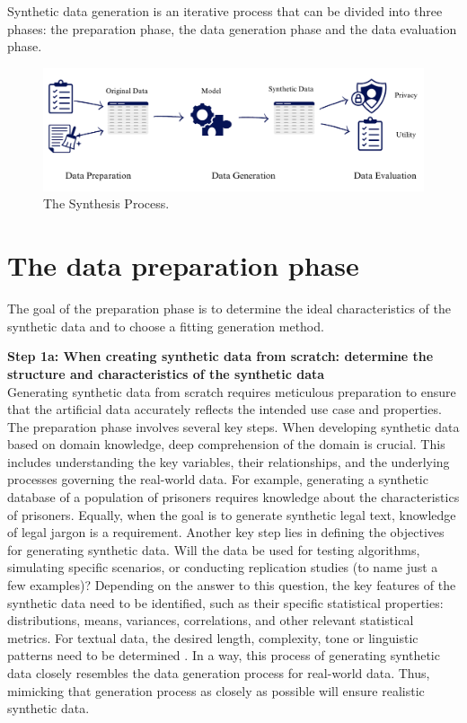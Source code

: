 

Synthetic data generation is an iterative process that can be divided into three phases: the preparation phase, the data generation phase and the data evaluation phase. 

\vspace{10pt}
\begin{figure}[h!]
    \centering
    \includegraphics[width=\textwidth]{Images/Screenshot 2024-08-06 at 12.00.18.png}
    \caption{The Synthesis Process.}
    \label{fig:synthesis_1}
\end{figure}
\vspace{10pt}

\section{The data preparation phase}

The goal of the preparation phase is to determine the ideal characteristics of the synthetic data and to choose a fitting generation method.

\textbf{Step 1a: When creating synthetic data from scratch: determine the structure and characteristics of the synthetic data} \\
Generating synthetic data from scratch requires meticulous preparation to ensure that the artificial data accurately reflects the intended use case and properties. The preparation phase involves several key steps. When developing synthetic data based on domain knowledge, deep comprehension of the domain is crucial. This includes understanding the key variables, their relationships, and the underlying processes governing the real-world data. For example, generating a synthetic database of a population of prisoners requires knowledge about the characteristics of prisoners. Equally, when the goal is to generate synthetic legal text, knowledge of legal jargon is a requirement. Another key step lies in defining the objectives for generating synthetic data. Will the data be used for testing algorithms, simulating specific scenarios, or conducting replication studies (to name just a few examples)? Depending on the answer to this question, the key features of the synthetic data need to be identified, such as their specific statistical properties: distributions, means, variances, correlations, and other relevant statistical metrics. For textual data, the desired length, complexity, tone or linguistic patterns need to be determined \cite{el2020practical,soltana2017synthetic}. In a way, this process of generating synthetic data closely resembles the data generation process for real-world data. Thus, mimicking that generation process as closely as possible will ensure realistic synthetic data.

